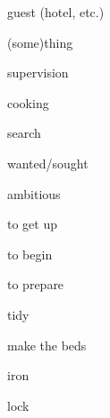 \documentclass[avery5371,grid,frame]{flashcards}
\begin{document}
\begin{flashcard}{\LARGE guest (hotel, etc.)}
\LARGE {}
\end{flashcard}
\begin{flashcard}{\LARGE (some)thing}
\LARGE {}
\end{flashcard}
\begin{flashcard}{\LARGE supervision}
\LARGE {}
\end{flashcard}
\begin{flashcard}{\LARGE cooking}
\LARGE {}
\end{flashcard}
\begin{flashcard}{\LARGE search}
\LARGE {}
\end{flashcard}
\begin{flashcard}{\LARGE wanted/sought}
\LARGE {}
\end{flashcard}
\begin{flashcard}{\LARGE ambitious}
\LARGE {}
\end{flashcard}
\begin{flashcard}{\LARGE to get up}
\LARGE {}
\end{flashcard}
\begin{flashcard}{\LARGE to begin}
\LARGE {}
\end{flashcard}
\begin{flashcard}{\LARGE to prepare}
\LARGE {}
\end{flashcard}
\begin{flashcard}{\LARGE tidy}
\LARGE {}
\end{flashcard}
\begin{flashcard}{\LARGE make the beds}
\LARGE {}
\end{flashcard}
\begin{flashcard}{\LARGE iron}
\LARGE {}
\end{flashcard}
\begin{flashcard}{\LARGE lock}
\LARGE {}
\end{flashcard}
\end{document}

